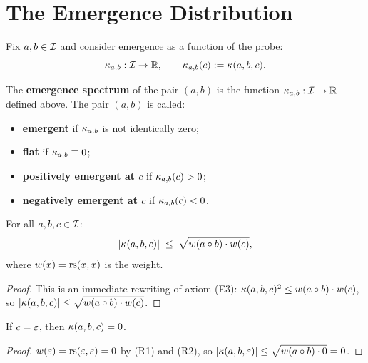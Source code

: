 \section{The Emergence Distribution}

Fix $a, b \in \mathcal{I}$ and consider emergence as a function of the probe:
\[
    \kappa_{a,b} : \mathcal{I} \to \mathbb{R}, \qquad
    \kappa_{a,b}(c) := \kappa(a, b, c).
\]

\begin{definition}
The \textbf{emergence spectrum} of the pair $(a,b)$ is the function
$\kappa_{a,b} : \mathcal{I} \to \mathbb{R}$ defined above. The pair $(a,b)$ is called:
\begin{itemize}
    \item \textbf{emergent} if $\kappa_{a,b}$ is not identically zero;
    \item \textbf{flat} if $\kappa_{a,b} \equiv 0$;
    \item \textbf{positively emergent at $c$} if $\kappa_{a,b}(c) > 0$;
    \item \textbf{negatively emergent at $c$} if $\kappa_{a,b}(c) < 0$.
\end{itemize}
\end{definition}

\begin{theorem}\label{thm:emergence-bound}
For all $a, b, c \in \mathcal{I}$:
\[
    |\kappa(a, b, c)| \;\leq\; \sqrt{w(a \circ b) \cdot w(c)},
\]
where $w(x) = \mathrm{rs}(x,x)$ is the weight.
\end{theorem}
\begin{proof}
This is an immediate rewriting of axiom (E3): $\kappa(a,b,c)^2 \leq
w(a \circ b) \cdot w(c)$, so $|\kappa(a,b,c)| \leq \sqrt{w(a \circ
b) \cdot w(c)}$.
\end{proof}

\begin{corollary}
If $c = \varepsilon$, then $\kappa(a,b,c) = 0$.
\end{corollary}
\begin{proof}
$w(\varepsilon) = \mathrm{rs}(\varepsilon, \varepsilon) = 0$ by (R1) and (R2), so $|\kappa(a,b,
\varepsilon)| \leq \sqrt{w(a \circ b) \cdot 0} = 0$.
\end{proof}

